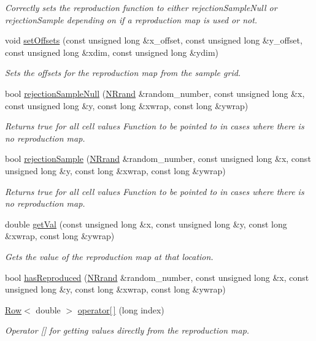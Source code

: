 \begin{DoxyCompactItemize}
\begin{DoxyCompactList}\small\item\em Correctly sets the reproduction function to either rejection\+Sample\+Null or rejection\+Sample depending on if a reproduction map is used or not. \end{DoxyCompactList}\item 
void \hyperlink{class_reproduction_map_aba75d30a9d2c7cd8aa06db17af286f7d}{set\+Offsets} (const unsigned long \&x\+\_\+offset, const unsigned long \&y\+\_\+offset, const unsigned long \&xdim, const unsigned long \&ydim)
\begin{DoxyCompactList}\small\item\em Sets the offsets for the reproduction map from the sample grid. \end{DoxyCompactList}\item 
bool \hyperlink{class_reproduction_map_a80dfa3194b7acabd813d9ae6b4ae3671}{rejection\+Sample\+Null} (\hyperlink{class_n_rrand}{N\+Rrand} \&random\+\_\+number, const unsigned long \&x, const unsigned long \&y, const long \&xwrap, const long \&ywrap)
\begin{DoxyCompactList}\small\item\em Returns true for all cell values Function to be pointed to in cases where there is no reproduction map. \end{DoxyCompactList}\item 
bool \hyperlink{class_reproduction_map_a2dccd14c9d4cdc1b14a63e7d95eba0ae}{rejection\+Sample} (\hyperlink{class_n_rrand}{N\+Rrand} \&random\+\_\+number, const unsigned long \&x, const unsigned long \&y, const long \&xwrap, const long \&ywrap)
\begin{DoxyCompactList}\small\item\em Returns true for all cell values Function to be pointed to in cases where there is no reproduction map. \end{DoxyCompactList}\item 
double \hyperlink{class_reproduction_map_a36cb74792a8e935eec6f7fcb6af3aeb8}{get\+Val} (const unsigned long \&x, const unsigned long \&y, const long \&xwrap, const long \&ywrap)
\begin{DoxyCompactList}\small\item\em Gets the value of the reproduction map at that location. \end{DoxyCompactList}\item 
bool \hyperlink{class_reproduction_map_aa8afbdf28197532a65c17035a075fe9b}{has\+Reproduced} (\hyperlink{class_n_rrand}{N\+Rrand} \&random\+\_\+number, const unsigned long \&x, const unsigned long \&y, const long \&xwrap, const long \&ywrap)
\item 
\hyperlink{class_row}{Row}$<$ double $>$ \hyperlink{class_reproduction_map_ad9489c17cf27be65c21f54ff20e6ccc8}{operator\mbox{[}$\,$\mbox{]}} (long index)
\begin{DoxyCompactList}\small\item\em Operator \mbox{[}\mbox{]} for getting values directly from the reproduction map. \end{DoxyCompactList}\end{DoxyCompactItemize}
